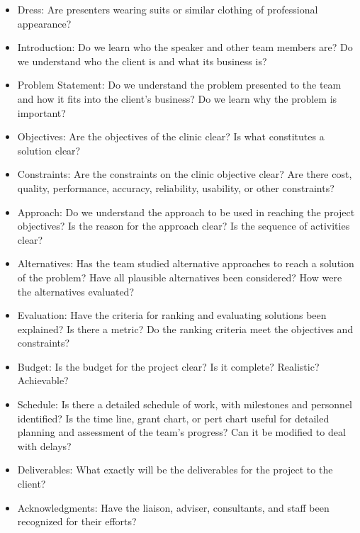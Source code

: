 \documentclass[12pt]{article}
\begin{document}
\begin{itemize}
\item Dress:  Are presenters wearing suits or similar clothing of
  professional appearance? 

\item Introduction: Do we learn who the speaker and other team members are?
Do we understand who the client is and what its business is?

\item Problem Statement:  Do we understand the problem presented to
  the team and how it fits into the client’s business? Do we learn why
  the problem is important?

\item Objectives: Are the objectives of the clinic clear? Is what
  constitutes a solution clear? 

\item Constraints: Are the constraints on the clinic objective clear?
  Are there cost, quality, performance, accuracy, reliability,
  usability, or other constraints?

\item Approach: Do we understand the approach to be used in reaching
  the project objectives? Is the reason for the approach clear? Is the
  sequence of activities clear?

\item Alternatives: Has the team studied alternative approaches to
  reach a solution of the problem? Have all plausible alternatives
  been considered? How were the alternatives evaluated?

\item Evaluation: Have the criteria for ranking and evaluating
  solutions been explained? Is there a metric? Do the ranking criteria
  meet the objectives and constraints?

\item Budget: Is the budget for the project clear? Is it complete?
  Realistic? Achievable?

\item Schedule: Is there a detailed schedule of work, with milestones
  and personnel identified? Is the time line, grant chart, or pert
  chart useful for detailed planning and assessment of the team’s
  progress? Can it be modified to deal with delays?

\item Deliverables: What exactly will be the deliverables for the
  project to the client? 

\item Acknowledgments: Have the liaison, adviser,
  consultants, and staff been recognized for their efforts?


\end{itemize}
\end{document}
